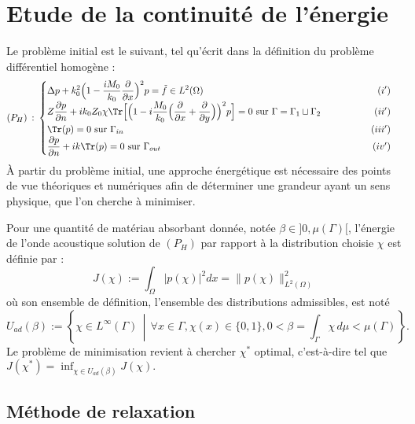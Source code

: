 \section{Etude de la continuité de l'énergie}

Le problème initial est le suivant, tel qu'écrit dans la définition du problème différentiel homogène : 
\[
    (P_H) \hspace{2pt} : \hspace{2pt}
    \begin{cases}
    \displaystyle \Delta p + k_0^2\Big(1 - \frac{iM_0}{k_0}\frac{\partial}{\partial x}\Big)^2p = \Tilde{f} \in L^2(\Omega) \hfill (i')\\
    \displaystyle Z\frac{\partial p}{\partial n} + ik_0Z_0\chi \Tr \Bigl[ \Bigl(1-i \frac{M_0}{k_0} \Big(\frac{\partial}{\partial x} + \frac{\partial}{\partial y}\Big) \Bigr)^2p \Bigr] = 0$ sur $\Gamma = \Gamma_1 \sqcup \Gamma_2 \hspace*{2cm} \hfill (ii')
    \\
    \displaystyle \Tr(p) = 0 $ sur $ \Gamma_{in} \hfill (iii') \\
    \displaystyle \frac{\partial p}{\partial n} + ik \Tr(p) = 0 $ sur $\Gamma_{out} \hfill (iv')
    \end{cases} 
\]
À partir du problème initial, une approche énergétique est nécessaire des points de vue théoriques et numériques afin de déterminer une grandeur ayant un sens physique, que l'on cherche à minimiser.
\begin{tcolorbox}[colback=blue!5!white,colframe=blue!75!black,title=Definition 4.0: Problème de minimisation]
Pour une quantité de matériau absorbant donnée, notée $\beta\in ]0,\mu(\Gamma)[$, l'énergie de l'onde acoustique solution de $(P_H)$ par rapport à la distribution choisie $\chi$ est définie par  : 
\[J(\chi):=\int_{\Omega} |p(\chi)|^2 dx = \|p(\chi)\|_{L^2(\Omega)}^2\]
où son ensemble de définition, l'ensemble des distributions admissibles, est noté
\[ U_{ad}(\beta) := \left\{\chi \in L^{\infty}(\Gamma) \, \middle| \, \forall x \in \Gamma, \chi(x) \in \{0,1\}, 0 < \beta = \int_{\Gamma} \chi \, d\mu < \mu(\Gamma)\right\} .\]
Le problème de minimisation revient à chercher $\chi^*$ optimal, c'est-à-dire tel que $\displaystyle J(\chi^*) = \inf_{\chi \in U_{ad}(\beta)}J(\chi).$
\end{tcolorbox}
\subsection{Méthode de relaxation}

